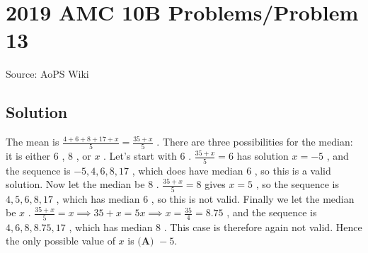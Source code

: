 \documentclass[12pt]{article}
\begin{document}
\section*{{2019 AMC 10B Problems/Problem 13}}
Source: AoPS Wiki

\subsection*{Solution}
The mean is $\frac{4+6+8+17+x}{5}=\frac{35+x}{5}$ . There are three possibilities for the median: it is either $6$ , $8$ , or $x$ . Let's start with $6$ . $\frac{35+x}{5}=6$ has solution $x=-5$ , and the sequence is $-5, 4, 6, 8, 17$ , which does have median $6$ , so this is a valid solution. Now let the median be $8$ . $\frac{35+x}{5}=8$ gives $x=5$ , so the sequence is $4, 5, 6, 8, 17$ , which has median $6$ , so this is not valid. Finally we let the median be $x$ . $\frac{35+x}{5}=x \implies 35+x=5x \implies x=\frac{35}{4}=8.75$ , and the sequence is $4, 6, 8, 8.75, 17$ , which has median $8$ . This case is therefore again not valid. Hence the only possible value of $x$ is $\boxed{\textbf{(A) }-5}.$
\end{document}
